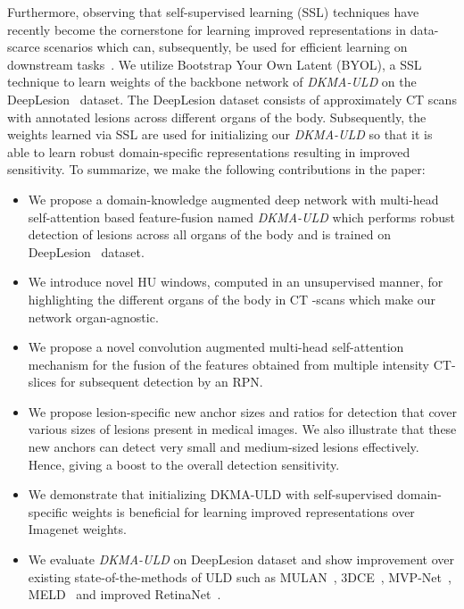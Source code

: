 \documentclass{bmvc2k}
\begin{document}
Furthermore, observing that self-supervised learning (SSL) techniques have recently become the cornerstone for learning improved representations in data-scarce scenarios which can, subsequently, be used for efficient learning on downstream tasks~\cite{simclr, ssl, grill2020bootstrap}. We utilize Bootstrap Your Own Latent (BYOL)\cite{grill2020bootstrap}, a SSL technique to learn weights of the backbone network of \emph{DKMA-ULD} on the DeepLesion~\cite{yan2018deeplesion} dataset. The DeepLesion dataset consists of approximately  CT scans with annotated lesions across different organs of the body. Subsequently, the weights learned via SSL are used for initializing our \emph{DKMA-ULD} so that it is able to learn robust domain-specific representations resulting in improved sensitivity. To summarize, we make the following contributions in the paper: \begin{itemize}
    \vspace{-2mm}
    \item We propose a domain-knowledge augmented deep network with multi-head self-attention based feature-fusion named \emph{DKMA-ULD} which performs robust detection of lesions across all organs of the body and is trained on DeepLesion~\cite{yan2018deeplesion} dataset.
    \vspace{-2mm}
    \item We introduce  novel HU windows, computed in an unsupervised manner, for highlighting the different organs of the body in CT -scans which make our network organ-agnostic. 
    \vspace{-2mm}
    \item We propose a novel convolution augmented multi-head self-attention mechanism for the fusion of the features obtained from multiple intensity CT-slices for subsequent detection by an RPN.
    \vspace{-2mm}
    \item We propose lesion-specific new anchor sizes and ratios for detection that cover various sizes of lesions present in medical images. We also illustrate that these new anchors can detect very small and medium-sized lesions effectively. Hence, giving a boost to the overall detection sensitivity.
    \vspace{-2mm}
    \item We demonstrate that initializing DKMA-ULD with self-supervised domain-specific weights is beneficial for learning improved representations over Imagenet weights.
    \vspace{-2mm}
    \item We evaluate \emph{DKMA-ULD} on DeepLesion dataset and show improvement over existing state-of-the-methods of ULD such as MULAN~\cite{yan2019mulan}, 3DCE~\cite{3dce}, MVP-Net~\cite{li2019mvp}, MELD~\cite{meld} and improved RetinaNet~\cite{retinanet_improv}.
    \vspace{-2mm}
\end{itemize}
\end{document}
